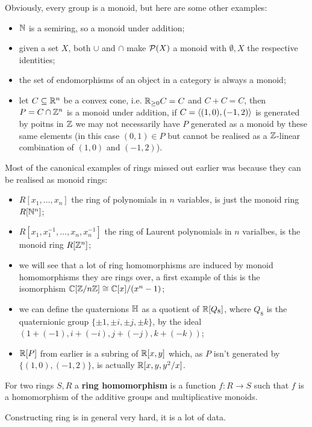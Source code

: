\documentclass{article}
\begin{document}
Obviously, every group is a monoid, but here are some other examples:\begin{itemize}
    \item $\mathbb{N}$ is a semiring, so a monoid under addition;
    \item given a set $X$, both $\cup$ and $\cap$ make $\mathcal{P}(X)$ a monoid with $\emptyset,X$ the respective identities;
    \item the set of endomorphisms of an object in a category is always a monoid;
    \item let $C\subseteq \mathbb{R}^n$ be a convex cone, i.e. $\mathbb{R}_{\geq 0}C = C$ and $C+C = C$, then $P=C\cap\mathbb{Z}^n$ is a monoid under addition, if $C=\left\langle (1,0),(-1,2) \right\rangle$ is generated by poitns in $\mathbb{Z}$ we may not necessarily have $P$ generated as a monoid by these same elements (in this case $(0,1)\in P$ but cannot be realised as a $\mathbb{Z}$-linear combination of $(1,0)$ and $(-1,2)$).
\end{itemize}

Most of the canonical examples of rings missed out earlier was because they can be realised as monoid rings: \begin{itemize}
    \item $R[x_1,\ldots,x_n]$ the ring of polynomials in $n$ variables, is just the monoid ring $R[\mathbb{N}^n]$;
    \item $R[x_1,x_1^{-1},\ldots,x_n,x_n^{-1}]$ the ring of Laurent polynomials in $n$ varialbes, is the monoid ring $R[\mathbb{Z}^n]$;
    \item we will see that a lot of ring homomorphisms are induced by monoid homomorphisms they are rings over, a first example of this is the isomorphism $\mathbb{C}[\mathbb{Z}/n\mathbb{Z}]\cong\mathbb{C}[x]/(x^n-1)$;
    \item we can define the quaternions $\mathbb{H}$ as a quotient of $\mathbb{R}[Q_8]$, where $Q_8$ is the quaternionic group $\{\pm 1,\pm i, \pm j,\pm k\}$, by the ideal $(1 + (-1), i + (-i),j+(-j),k+(-k))$;
    \item $\mathbb{R}[P]$ from earlier is a subring of $\mathbb{R}[x,y]$ which, as $P$ isn't generated by $\{(1,0),(-1,2)\}$, is actually $\mathbb{R}[x,y,y^2/x]$.
\end{itemize}

\begin{definition}
    For two rings $S,R$ a \textbf{ring homomorphism} is a function $f:R\rightarrow S$ such that $f$ is a homomorphism of the additive groups and multiplicative monoids.
\end{definition}

Constructing ring is in general very hard, it is a lot of data.
\end{document}
